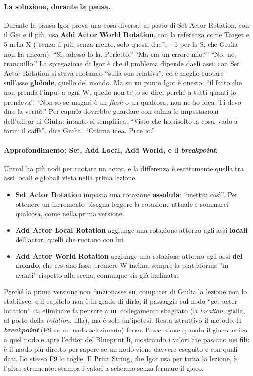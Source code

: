 \paragraph{La soluzione, durante la pausa.} Durante la pausa Igor prova una cosa diversa:
al posto di Set Actor Rotation, con il Get e il più, usa \textbf{Add Actor World
Rotation}, con la referenza come Target e 5 nella X (``senza il più, senza niente, solo
questi due''; $-5$ per la S, che Giulia non ha ancora). ``Sì, adesso lo fa. Perfetto.''
``Ma era un errore mio?'' ``No, no, tranquillo.'' La spiegazione di Igor è che il problema
dipende dagli assi: con Set Actor Rotation si stava ruotando ``sulla sua relativa'', ed è
meglio ruotare sull'asse \textbf{globale}, quello del mondo. Ma su un punto Igor è
onesto: ``il fatto che non prenda l'input a ogni W, quello non te lo so dire, perché a
tutti quanti lo prendeva''. ``Non so se magari è un \emph{flash} o un qualcosa, non ne ho
idea. Ti devo dire la verità.'' Per capirlo dovrebbe guardare con calma le impostazioni
dell'editor di Giulia; intanto si semplifica. ``Visto che ho risolto la cosa, vado a farmi il
caffè'', dice Giulia. ``Ottima idea. Pure io.''

\paragraph{Approfondimento: Set, Add Local, Add World, e il \emph{breakpoint}.} Unreal ha
più nodi per ruotare un actor, e la differenza è esattamente quella tra assi locali e
globali vista nella prima lezione.
\begin{itemize}
  \item \textbf{Set Actor Rotation} imposta una rotazione \textbf{assoluta}: ``mettiti
        così''. Per ottenere un incremento bisogna leggere la rotazione attuale e
        sommarci qualcosa, come nella prima versione.
  \item \textbf{Add Actor Local Rotation} aggiunge una rotazione attorno agli assi
        \textbf{locali} dell'actor, quelli che ruotano con lui.
  \item \textbf{Add Actor World Rotation} aggiunge una rotazione attorno agli assi
        \textbf{del mondo}, che restano fissi: premere W inclina sempre la piattaforma
        ``in avanti'' rispetto alla scena, comunque sia già inclinata.
\end{itemize}
Perché la prima versione non funzionasse sul computer di Giulia la lezione non lo
stabilisce, e il capitolo non è in grado di dirlo; il passaggio sul nodo ``get actor
location'' da eliminare fa pensare a un collegamento sbagliato (la \emph{location},
gialla, al posto della \emph{rotation}, lilla), ma è solo un'ipotesi. Resta istruttivo
il metodo. Il \textbf{\emph{breakpoint}} (F9 su un nodo selezionato) ferma l'esecuzione
quando il gioco arriva a quel nodo e apre l'editor del Blueprint lì, mostrando i valori
che passano nei fili: è il modo più diretto per sapere se un nodo viene davvero eseguito
e con quali dati. Lo stesso F9 lo toglie. Il Print String, che Igor usa per tutta la
lezione, è l'altro strumento: stampa i valori a schermo senza fermare il gioco.

